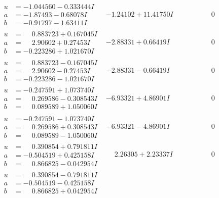 \documentclass[1p]{elsarticle_modified}
\theoremstyle{definition}
\begin{document}
$$\begin{array}{c|c|c}
\begin{aligned}
u &= -1.044560 - 0.333444 I \\
a &= -1.87493 - 0.68078 I \\
b &= -0.91797 - 1.63411 I\end{aligned}
 & -1.24102 + 11.41750 I & \phantom{-0.000000 } 0 \\ \hline\begin{aligned}
u &= \phantom{-}0.883723 + 0.167045 I \\
a &= \phantom{-}2.90602 + 0.27453 I \\
b &= -0.223286 + 1.021670 I\end{aligned}
 & -2.88331 + 0.66419 I & \phantom{-0.000000 } 0 \\ \hline\begin{aligned}
u &= \phantom{-}0.883723 - 0.167045 I \\
a &= \phantom{-}2.90602 - 0.27453 I \\
b &= -0.223286 - 1.021670 I\end{aligned}
 & -2.88331 - 0.66419 I & \phantom{-0.000000 } 0 \\ \hline\begin{aligned}
u &= -0.247591 + 1.073740 I \\
a &= \phantom{-}0.269586 - 0.308543 I \\
b &= \phantom{-}0.089589 + 1.050060 I\end{aligned}
 & -6.93321 + 4.86901 I & \phantom{-0.000000 } 0 \\ \hline\begin{aligned}
u &= -0.247591 - 1.073740 I \\
a &= \phantom{-}0.269586 + 0.308543 I \\
b &= \phantom{-}0.089589 - 1.050060 I\end{aligned}
 & -6.93321 - 4.86901 I & \phantom{-0.000000 } 0 \\ \hline\begin{aligned}
u &= \phantom{-}0.390854 + 0.791811 I \\
a &= -0.504519 + 0.425158 I \\
b &= \phantom{-}0.866825 - 0.042954 I\end{aligned}
 & \phantom{-}2.26305 + 2.23337 I & \phantom{-0.000000 } 0 \\ \hline\begin{aligned}
u &= \phantom{-}0.390854 - 0.791811 I \\
a &= -0.504519 - 0.425158 I \\
b &= \phantom{-}0.866825 + 0.042954 I\end{aligned}

\end{array}$$
\end{document}
